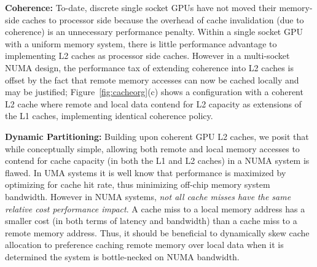 \textbf{Coherence:} To-date, discrete
single socket GPUs have not moved their memory-side caches to processor side 
because the overhead of cache invalidation (due to coherence) is an 
unnecessary performance penalty.  Within a single socket GPU with a uniform
memory system, there is little performance advantage to implementing L2 caches
as processor side caches.  However in a multi-socket NUMA design, the performance tax
of extending coherence into L2 caches is offset by the fact that remote memory
accesses can now be cached locally and may be justified;
Figure~\ref{fig:cacheorg}(c) shows a configuration with 
a coherent L2 cache where remote and local data contend for L2 capacity as
extensions of the L1 caches, implementing identical coherence policy.

\textbf{Dynamic Partitioning:} Building upon coherent GPU L2 caches, we posit that while 
conceptually simple, allowing both remote and 
local memory accesses to contend for cache capacity (in both the L1 and L2 caches) 
in a NUMA system is flawed. In UMA systems it is well know that performance 
is maximized by optimizing for cache 
hit rate, thus minimizing off-chip memory system bandwidth. However in NUMA systems, 
\textit{not all cache misses have the same relative cost
performance impact}. A cache miss to a local memory address has a 
smaller cost (in both terms of latency and bandwidth) than a cache miss to a 
remote memory address. Thus, it should be beneficial to dynamically 
skew cache allocation to preference caching remote memory over 
local data when it is determined the system is bottle-necked on NUMA bandwidth.

